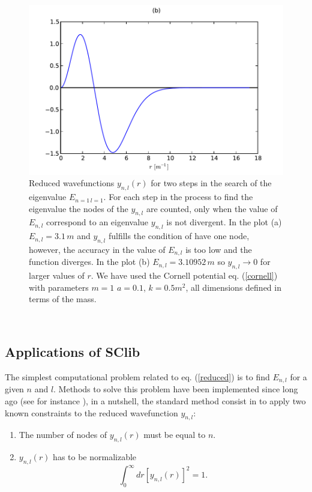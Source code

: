 \documentclass[10pt, a4paper, twocolumn]{article}
\begin{document}
{\begin{figure}[htb]
\begin{minipage}[b]{.9\linewidth}
\end{minipage}
\vfill
\noindent\begin{minipage}[b]{.9\linewidth}
\includegraphics[width=\textwidth]{wfb.pdf}
\end{minipage}
\hfill
\caption{Reduced wavefunctions $y_{n,l}(r)$ for two steps in the search of the eigenvalue $E_{n=1\,l=1}$. For each step in the process to find the eigenvalue the nodes of the $y_{n,l}$ are counted, only when the value of $E_{n,l}$ correspond to an eigenvalue $y_{n,l}$ is not divergent. In the plot (a) $E_{n,l} = 3.1\,m$ and $y_{n,l}$ fulfills the condition of have one node, however, the accuracy in the value of $E_{n,l}$ is too low and the function diverges. In the plot (b)  $E_{n,l} = 3.10952\,m$ so $y_{n,l}\rightarrow 0$ for larger values of $r$. We have used the Cornell potential eq. (\ref{cornell}) with parameters $m = 1$ $a = 0.1$, $k =0.5m^2$, all dimensions defined in terms of the mass.}
\label{wavefunctions}
\end{figure}
\\
\subsection{Applications of SClib}
The simplest computational problem related to eq. (\ref{reduced}) is to find $E_{n,l}$ for a given $n$ and $l$. Methods to solve this problem have been implemented since long ago (see for instance \cite{schroe1}), in a nutshell, the standard method consist in to apply two known constraints to the reduced wavefunction $y_{n,l}$:

\begin{enumerate}
\item The number of nodes of $y_{n,l}(r)$ must be equal to $n$.
\item $y_{n,l}(r)$  has to be normalizable
\begin{equation}\label{norm}
	\int_0^\infty dr[y_{n,l}(r)]^2 = 1.
\end{equation} 
\end{enumerate}

}
\end{document}
